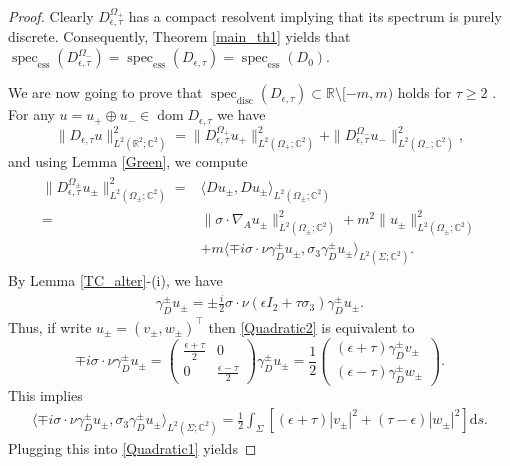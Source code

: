 \documentclass[10pt,a4paper]{amsart}
\def \cc {{\mathbb C}}
\DeclareMathOperator{\dom}{dom}
\def \rr {{\mathbb R}}
\DeclareMathOperator{\spec}{spec}
\newcommand{\specd}{\spec_\mathrm{disc}}
\newcommand{\spece}{\spec_\mathrm{ess}}
\begin{document}
\begin{proof} Clearly $D_{\epsilon,\tau}^{\Omega_+}$ has a compact resolvent implying that its spectrum is purely discrete. Consequently, Theorem \ref{main_th1} yields that $\spece(D_{\epsilon,\tau}^{\Omega_-})=\spece(D_{\epsilon,\tau})=\spece(D_0)$.

We are now going to prove that $\specd(D_{\epsilon,\tau})\subset \rr\setminus [-m,m)$ holds for $\tau\geq2$ .  For any $u=u_+\oplus u_-\in\dom D_{\epsilon,\tau}$ we have 
\[
\|D_{\epsilon,\tau}u \|^2_{L^2(\rr^2;\cc^2)}= \|D_{\epsilon,\tau}^{\Omega_+}u_+ \|^2_{L^2(\Omega_+;\cc^2)}+\|D_{\epsilon,\tau}^{\Omega_-} u_- \|^2_{L^2(\Omega_-;\cc^2)},
\]
 and using Lemma \ref{Green}, we compute    
 \begin{align}\label{Quadratic1}
 \begin{split}
 \|D_{\epsilon,\tau}^{\Omega_\pm}u_\pm \|^2_{L^2(\Omega_\pm;\cc^2)}=& \langle D u_\pm, D u_\pm\rangle_{L^2(\Omega_\pm;\cc^2)}\\
 =&  \|\sigma\cdot\nabla_Au_\pm \|^2_{L^2(\Omega_\pm;\cc^2)} + m^2  \| u_\pm \|^2_{L^2(\Omega_\pm;\cc^2)}\\
 &+m\langle \mp i\sigma\cdot\nu \gamma_D^\pm u_\pm, \sigma_3 \gamma_D^\pm u_\pm\rangle_{L^2(\Sigma;\cc^2)} .  
 \end{split}
 \end{align}
By Lemma \ref{TC_alter}-(i), we have 
 \begin{align}\label{Quadratic2}
 \gamma_D^\pm u_\pm= \pm\frac{i}{2}\sigma\cdot\nu(\epsilon I_2+\tau\sigma_3)\gamma_D^\pm u_\pm.
 \end{align}
 Thus, if write  $u_\pm =(v_\pm,w_\pm)^\top$ then  \eqref{Quadratic2} is equivalent to
 \[
 \mp i\sigma\cdot\nu \gamma_D^\pm u_\pm= \begin{pmatrix}
     \frac{\epsilon+\tau}{2} & 0\\
     0 & \frac{\epsilon-\tau}{2}
 \end{pmatrix} \gamma_D^\pm u_\pm  = \frac{1}{2} \begin{pmatrix}(\epsilon+\tau)\gamma_D^\pm v_\pm\\
(\epsilon-\tau) \gamma_D^\pm w_\pm
 \end{pmatrix}.
 \]
 This implies 
 \begin{align*}
 \langle \mp i\sigma\cdot\nu \gamma_D^\pm u_\pm, \sigma_3 \gamma_D^\pm u_\pm\rangle_{L^2(\Sigma;\cc^2)}= \frac{1}{2}\int_\Sigma \left[  (\epsilon+\tau) |v_\pm |^2 + (\tau-\epsilon) |w_\pm |^2 \right]\mathrm{d}s.
 \end{align*}
  Plugging this into  \eqref{Quadratic1}  yields 

\end{proof}
\end{document}
